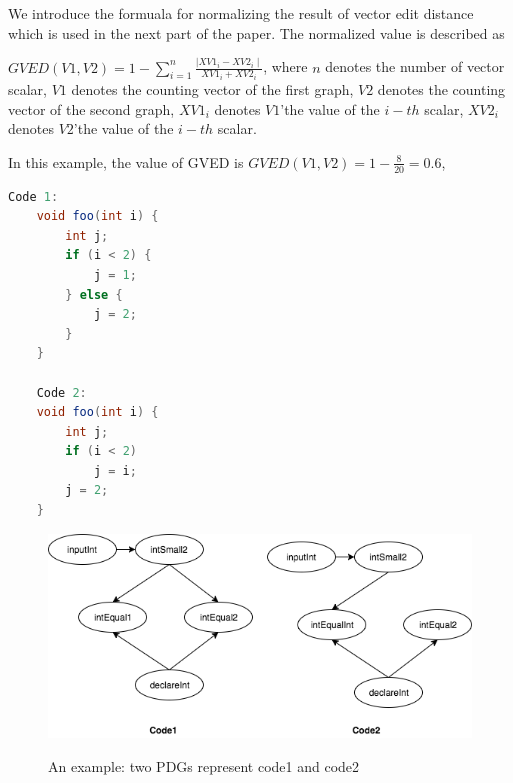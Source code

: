 We introduce the formuala for normalizing the result of vector edit distance which is used in the next part of the paper. The normalized value is described as

$GVED(V1, V2) = 1 - \sum_{i=1}^{n} \frac{ \mid XV1_i - XV2_i \mid}{XV1_i + XV2_i}$, 
where $n$ denotes the number of vector scalar, $V1$ denotes the counting vector of the first graph, $V2$ denotes the counting vector of the second graph, $XV1_i$ denotes $V1$\rq the value of the $i-th$ scalar, $XV2_i$ denotes $V2$\rq the value of the $i-th$ scalar.  

In this example, the value of GVED is $GVED(V1, V2) = 1 - \frac{8 }{20} = 0.6 $,


\begin{lstlisting}[language=JAVA]
	Code 1:
	void foo(int i) {
		int j;
		if (i < 2) {
			j = 1;
		} else {
			j = 2;
		}
	}

	Code 2:
	void foo(int i) {
		int j;
		if (i < 2) 
			j = i;	 
		j = 2;
	}
\end{lstlisting}
\begin{figure}[h]
	\caption{An example: two PDGs represent code1 and code2}
	\includegraphics[scale=0.4]{img/Diagram_PDG.png}
	\centering
	\label{fig:PDGs}
\end{figure}

